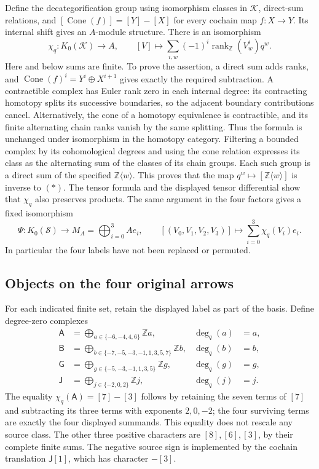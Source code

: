 Define the decategorification group using isomorphism classes in
\(\mathcal K\), direct-sum relations, and
\([\operatorname{Cone}(f)]=[Y]-[X]\) for every cochain map
\(f:X\to Y\). Its internal shift gives an \(A\)-module structure.
There is an isomorphism
\[
 \chi_q:K_0(\mathcal K)\longrightarrow A,
 \qquad [V]\longmapsto
 \sum_{i,w}(-1)^i\operatorname{rank}_{\mathbb Z}(V^i_w)q^w.
 \tag{*}
\]
Here and below sums are finite. To prove the assertion, a direct sum adds
ranks, and \(\operatorname{Cone}(f)^i=Y^i\oplus X^{i+1}\) gives exactly
the required subtraction. A contractible complex has Euler rank zero
in each internal degree: its contracting homotopy splits its successive
boundaries, so the adjacent boundary contributions cancel. Alternatively,
the cone of a homotopy equivalence is contractible, and its finite
alternating chain ranks vanish by the same splitting. Thus the formula
is unchanged under isomorphism in the homotopy category. Filtering a
bounded complex by its cohomological degrees and using the cone relation
expresses its class as the alternating sum of the classes of its chain
groups. Each such group is a direct sum of the specified
\(\mathbb Z\langle w\rangle\). This proves that the map
\(q^w\mapsto[\mathbb Z\langle w\rangle]\) is inverse to
\((\ast)\). The tensor formula and the displayed tensor differential
show that \(\chi_q\) also preserves products. The same argument in the
four factors gives a fixed isomorphism
\[
 \Psi:K_0(\mathcal S)\longrightarrow M_A=\bigoplus_{i=0}^3Ae_i,
 \qquad[(V_0,V_1,V_2,V_3)]\longmapsto
 \sum_{i=0}^3\chi_q(V_i)e_i.
\]
In particular the four labels have not been replaced or permuted.

\subsection{Objects on the four original arrows}

For each indicated finite set, retain the displayed label as part of
the basis. Define degree-zero complexes
\[
 \begin{aligned}
 \mathsf A&=\bigoplus_{a\in\{-6,-4,4,6\}}\mathbb Z a,
       &\deg_q(a)&=a,\\
 \mathsf B&=\bigoplus_{b\in\{-7,-5,-3,-1,1,3,5,7\}}\mathbb Z b,
       &\deg_q(b)&=b,\\
 \mathsf G&=\bigoplus_{g\in\{-5,-3,-1,1,3,5\}}\mathbb Z g,
       &\deg_q(g)&=g,\\
 \mathsf J&=\bigoplus_{j\in\{-2,0,2\}}\mathbb Z j,
       &\deg_q(j)&=j.
 \end{aligned}
\]
The equality \(\chi_q(\mathsf A)=[7]-[3]\) follows by retaining
the seven terms of \([7]\) and subtracting its three terms with
exponents \(2,0,-2\); the four surviving terms are exactly the four
displayed summands. This equality does not rescale any source class.
The other three positive characters are \([8],[6],[3]\), by their
complete finite sums. The negative source sign is implemented by the
cochain translation \(\mathsf J[1]\), which has character \(-[3]\).

